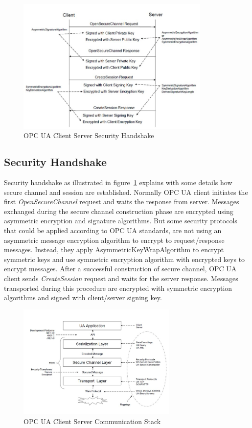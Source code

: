 \begin{figure}[!htbp]
	\centering
	\includegraphics[width=0.85\textwidth]{opc_ua_shs.jpg}
		\caption{OPC UA Client Server Security Handshake\cite{O2}}
	\label{fig:opc_ua_cs_shs}
\end{figure}

\subsection{Security Handshake}
Security handshake as illustrated in figure~\ref{fig:opc_ua_cs_shs} explains with some details how secure channel and session are established. Normally OPC UA client initiates the first \emph{OpenSecureChannel} request and waits the response from server. Messages exchanged during the secure channel construction phase are encrypted using asymmetric encryption and signature algorithms. But some security protocols that could be applied according to OPC UA standards, are not using an asymmetric message encryption algorithm to encrypt to request/response messages. Instead, they apply AsymmetricKeyWrapAlgorithm to encrypt symmetric keys and use symmetric encryption algorithm with encrypted keys to encrypt messages. After a successful construction of secure channel, OPC UA client sends \emph{CreateSession} request and waits for the server response. Messages transported during this procedure are encrypted with symmetric encryption algorithms and signed with client/server signing key.
\begin{figure}[!htbp]
	\centering
	\includegraphics[width=0.7\textwidth]{opc_ua_commstack.jpg}
		\caption{OPC UA Client Server Communication Stack\cite{O2}}
	\label{fig:opc_ua_commstack}
\end{figure}

